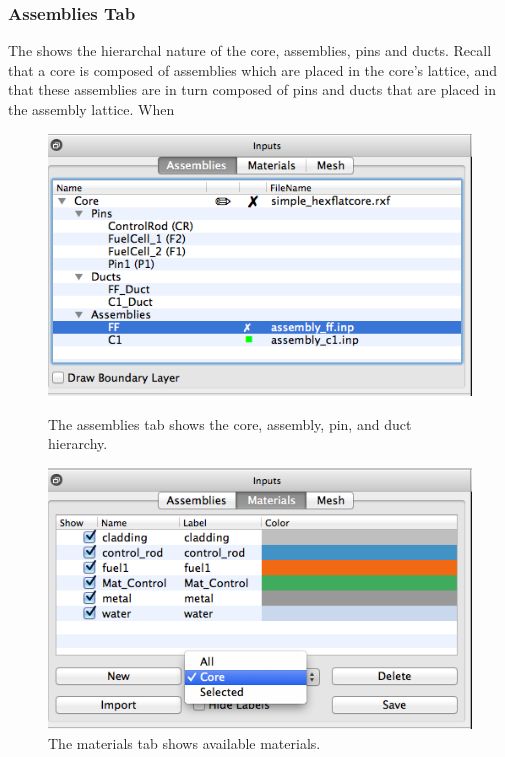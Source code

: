 \subsubsection{Assemblies Tab}
The  shows the hierarchal nature of the core, assemblies, pins and ducts.  Recall that a core is composed of assemblies which are placed in the core's lattice, and that these assemblies are in turn composed of pins and ducts that are placed in the assembly lattice.  When 


\begin{figure}
\centering
\begin{minipage}{.45\textwidth}
  \centering
	\includegraphics[width=0.9\linewidth]{Images/assemblies-tab.png}
	\caption{The assemblies tab shows the core, assembly, pin, and duct hierarchy.}
	\label{fig:mainwindow2}
\end{minipage} \hspace{.5cm}%
\begin{minipage}{.45\textwidth}
  \centering
	\includegraphics[width=0.9\linewidth]{Images/materials-tab.png}
	\caption{The materials tab shows available materials.}
	\label{fig:mainwindow3}
\end{minipage}
\end{figure}


